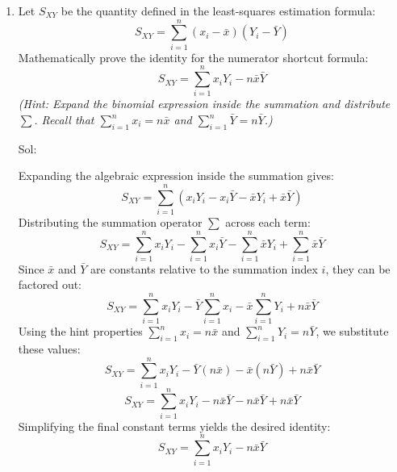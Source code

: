 \documentclass[11pt,svgnames,spanish,oneside]{amsart}
\newenvironment{mysolution}{%
  \bigskip

  \solution\color{blue}Sol:
}{%
  \endsolution
}
\begin{document}
\begin{enumerate}[label=\textbf{P\arabic*.},itemsep=1em,leftmargin=*]
\begin{enumerate}
  \bigskip
  \item Let $S_{XY}$ be the quantity defined in the least-squares estimation formula:
  $$ S_{XY} = \sum_{i=1}^n (x_i - \bar{x})(Y_i - \bar{Y})$$
  Mathematically prove the identity for the numerator shortcut formula:
    $$ S_{XY} = \sum_{i=1}^n x_i Y_i - n\bar{x}\bar{Y} $$
    \textit{(Hint: Expand the binomial expression inside the summation and distribute $\sum$. Recall that $\sum_{i=1}^n x_i = n\bar{x}$ and $\sum_{i=1}^n \bar{Y} = n\bar{Y}$.)}

  \begin{mysolution}
  Expanding the algebraic expression inside the summation gives:
  $$ S_{XY} = \sum_{i=1}^n (x_i Y_i - x_i \bar{Y} - \bar{x} Y_i + \bar{x}\bar{Y}) $$
  Distributing the summation operator $\sum$ across each term:
  $$ S_{XY} = \sum_{i=1}^n x_i Y_i - \sum_{i=1}^n x_i \bar{Y} - \sum_{i=1}^n \bar{x} Y_i + \sum_{i=1}^n \bar{x}\bar{Y} $$
  Since $\bar{x}$ and $\bar{Y}$ are constants relative to the summation index $i$, they can be factored out:
  $$ S_{XY} = \sum_{i=1}^n x_i Y_i - \bar{Y} \sum_{i=1}^n x_i - \bar{x} \sum_{i=1}^n Y_i + n\bar{x}\bar{Y} $$
  Using the hint properties $\sum_{i=1}^n x_i = n\bar{x}$ and $\sum_{i=1}^n Y_i = n\bar{Y}$, we substitute these values:
  $$ S_{XY} = \sum_{i=1}^n x_i Y_i - \bar{Y}(n\bar{x}) - \bar{x}(n\bar{Y}) + n\bar{x}\bar{Y} $$
  $$ S_{XY} = \sum_{i=1}^n x_i Y_i - n\bar{x}\bar{Y} - n\bar{x}\bar{Y} + n\bar{x}\bar{Y} $$
  Simplifying the final constant terms yields the desired identity:
  $$ S_{XY} = \sum_{i=1}^n x_i Y_i - n\bar{x}\bar{Y} $$
  \end{mysolution}

  \end{enumerate}

\end{enumerate}
\end{document}
